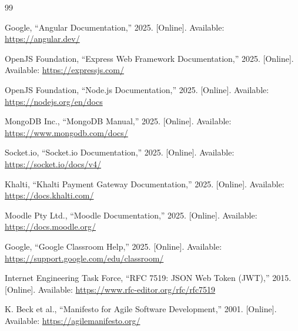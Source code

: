 \documentclass[12pt,a4paper]{report}
\begin{document}
\clearpage
{}
\begin{thebibliography}{99}

 Google, ``Angular Documentation,'' 2025. [Online]. Available: \url{https://angular.dev/}

 OpenJS Foundation, ``Express Web Framework Documentation,'' 2025. [Online]. Available: \url{https://expressjs.com/}

 OpenJS Foundation, ``Node.js Documentation,'' 2025. [Online]. Available: \url{https://nodejs.org/en/docs}

 MongoDB Inc., ``MongoDB Manual,'' 2025. [Online]. Available: \url{https://www.mongodb.com/docs/}

 Socket.io, ``Socket.io Documentation,'' 2025. [Online]. Available: \url{https://socket.io/docs/v4/}

 Khalti, ``Khalti Payment Gateway Documentation,'' 2025. [Online]. Available: \url{https://docs.khalti.com/}

 Moodle Pty Ltd., ``Moodle Documentation,'' 2025. [Online]. Available: \url{https://docs.moodle.org/}

 Google, ``Google Classroom Help,'' 2025. [Online]. Available: \url{https://support.google.com/edu/classroom/}

 Internet Engineering Task Force, ``RFC 7519: JSON Web Token (JWT),'' 2015. [Online]. Available: \url{https://www.rfc-editor.org/rfc/rfc7519}

 K. Beck et al., ``Manifesto for Agile Software Development,'' 2001. [Online]. Available: \url{https://agilemanifesto.org/}

\end{thebibliography}
\end{document}

